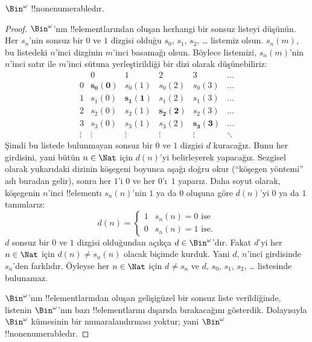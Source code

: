 \documentclass[../../../include/open-logic-section]{subfiles}
\begin{document}
\begin{thm}
$\Bin^\omega$ !!{nonenumerable}dır.
\end{thm}

\begin{proof}
$\Bin^\omega$'nın !!{element}larından oluşan herhangi bir sonsuz listeyi düşünün.
Her $s_n$'nin sonsuz bir $0$ ve $1$ dizgisi olduğu $s_0$, $s_1$, $s_2$,
\dots{} listemiz olsun. $s_n(m)$, bu listedeki $n$'inci dizginin $m$'inci
basamağı olsun. Böylece listemizi, $s_n(m)$'nin $n$'inci satır ile $m$'inci
sütuna yerleştirildiği bir dizi olarak düşünebiliriz:
\[
\begin{array}{c|c|c|c|c|c}
& 0 & 1 & 2 & 3 & \dots \\\hline
0 & \mathbf{s_{0}(0)} & s_{0}(1) & s_{0}(2) & s_0(3) & \dots \\\hline
1 & s_{1}(0)& \mathbf{s_{1}(1)} & s_1(2) & s_1(3) & \dots \\\hline
2 & s_{2}(0)& s_{2}(1) & \mathbf{s_2(2)} & s_2(3) & \dots \\\hline
3 & s_{3}(0)& s_{3}(1) & s_3(2) & \mathbf{s_3(3)} & \dots \\\hline
\vdots & \vdots & \vdots & \vdots & \vdots & \mathbf{\ddots}
\end{array}
\]
Şimdi bu listede bulunmayan sonsuz bir $0$ ve $1$ dizgisi $d$ kuracağız.
Bunu her girdisini, yani bütün $n\in\Nat$ için $d(n)$'yi belirleyerek
yapacağız. Sezgisel olarak yukarıdaki dizinin köşegeni boyunca aşağı doğru
okur (``köşegen yöntemi'' adı buradan gelir), sonra her $1$'i $0$ ve her
$0$'ı~$1$ yaparız. Daha soyut olarak, köşegenin $n$'inci !!{element}ı
$s_n(n)$'nin $1$ ya da $0$ oluşuna göre $d(n)$'yi $0$ ya da $1$ tanımlarız:
\[
d(n) =
\begin{cases}
1 & \text{$s_{n}(n) = 0$ ise}\\
0 & \text{$s_{n}(n) = 1$ ise.}
\end{cases}
\]
$d$ sonsuz bir $0$ ve $1$ dizgisi olduğundan açıkça $d\in\Bin^\omega$'dır.
Fakat $d$'yi her $n\in\Nat$ için $d(n)\neq s_n(n)$ olacak biçimde kurduk.
Yani $d$, $n$'inci girdisinde $s_n$'den farklıdır. Öyleyse her
$n\in\Nat$ için $d\neq s_n$ ve $d$, $s_0$, $s_1$, $s_2$, \dots{} listesinde
bulunamaz.

$\Bin^\omega$'nın !!{element}larından oluşan gelişigüzel bir sonsuz liste
verildiğinde, listenin $\Bin^\omega$'nın bazı !!{element}larını
dışarıda bırakacağını gösterdik. Dolayısıyla $\Bin^\omega$ kümesinin bir
numaralandırması yoktur; yani $\Bin^\omega$ !!{nonenumerable}dır.
\end{proof}
\end{document}
